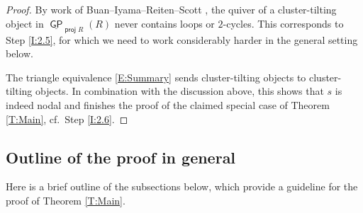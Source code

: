 \documentclass[reqno, 12pt, a4paper, twosided, english]{amsart}
\theoremstyle{plain}
\theoremstyle{definition}
\theoremstyle{remark}
\newtheorem*{Key Statement}{Key Statement}
\newcommand{\ul}[1]{\underline{#1}}
\newcommand{\GP}{\opname{GP}}
\newcommand{\opname}[1]{\operatorname{\mathsf{#1}}}
\newcommand{\proj}{\opname{proj}\nolimits}
\begin{document}
\begin{proof}
By work of Buan--Iyama--Reiten--Scott \cite{BIRSc}, the quiver of a cluster-tilting object in $\ul{\GP}_{\proj R}(R)$ never contains loops or $2$-cycles. This corresponds to Step \ref{I:2.5}, for which we need to work considerably harder in the general setting below.

The triangle equivalence \eqref{E:Summary} sends cluster-tilting objects to cluster-tilting objects. In combination with the discussion above, this shows that $s$ is indeed nodal and finishes the proof of the claimed special case of Theorem \ref{T:Main}, cf.\ Step \ref{I:2.6}.
\end{proof}

\subsection*{Outline of the proof in general}
Here is a brief outline of the subsections below, which provide a guideline for the proof of Theorem \ref{T:Main}.
%
%
%
%
%
%
%
%
%
%
%
%
%
%
%
%
%
%
%
%
\end{document}
